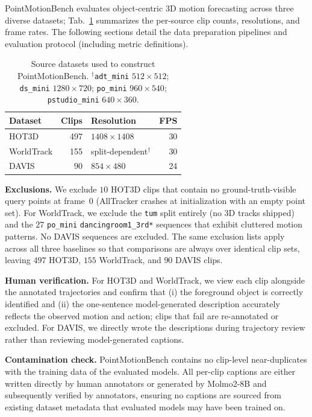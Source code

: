 \documentclass{llmxive}
\providecommand{\benchmarkname}{PointMotionBench\xspace}
\begin{document}
\benchmarkname{} evaluates object-centric 3D motion forecasting across three
diverse datasets; Tab.~\ref{tab:appendix-3dworldbench-sources} summarizes the
per-source clip counts, resolutions, and frame rates. The following sections
detail the data preparation pipelines and evaluation protocol (including
metric definitions).

\begin{table}[!htbp]
  \centering
  \small
  \setlength{\tabcolsep}{6pt}
  \begin{tabular}{lrlr}
    Dataset    & Clips & Resolution                & FPS \\
    \midrule
    HOT3D      & 497   & $1408\times1408$          & 30  \\
    WorldTrack & 155   & split-dependent$^\dagger$ & 30  \\
    DAVIS      & 90    & $854\times480$            & 24  \\
  \end{tabular}
  \vspace{2mm}
  \caption{Source datasets used to construct \benchmarkname{}.
    $^\dagger$\texttt{adt\_mini} $512\times512$; \texttt{ds\_mini} $1280\times720$;
    \texttt{po\_mini} $960\times540$; \texttt{pstudio\_mini} $640\times360$.}
  \label{tab:appendix-3dworldbench-sources}
\end{table}

\noindent\textbf{Exclusions.}
We exclude $10$ HOT3D clips that contain no ground-truth-visible query points at
frame~$0$ (AllTracker crashes at initialization with an empty point set).
For WorldTrack, we exclude the \texttt{tum} split entirely (no 3D tracks
shipped) and the $27$ \texttt{po\_mini} \texttt{dancingroom1\_3rd*}
sequences that exhibit cluttered motion patterns. No DAVIS sequences are
excluded. The same exclusion lists apply across all three baselines so that
comparisons are always over identical clip sets, leaving $497$ HOT3D, $155$
WorldTrack, and $90$ DAVIS clips.

\noindent\textbf{Human verification.}
For HOT3D and WorldTrack, we view each clip alongside the annotated
trajectories and confirm that (i) the foreground object is correctly
identified and (ii) the one-sentence model-generated description accurately reflects the
observed motion and action; clips that fail are re-annotated or excluded.
For DAVIS, we directly wrote the descriptions during trajectory review rather than reviewing model-generated captions.

\noindent\textbf{Contamination check.}
\benchmarkname{} contains no clip-level near-duplicates with the training
data of the evaluated models. All per-clip captions are either written directly by human
annotators or generated by Molmo2-8B and subsequently verified by annotators,
ensuring no captions are sourced from existing dataset metadata that evaluated models may have been trained on.
\end{document}
